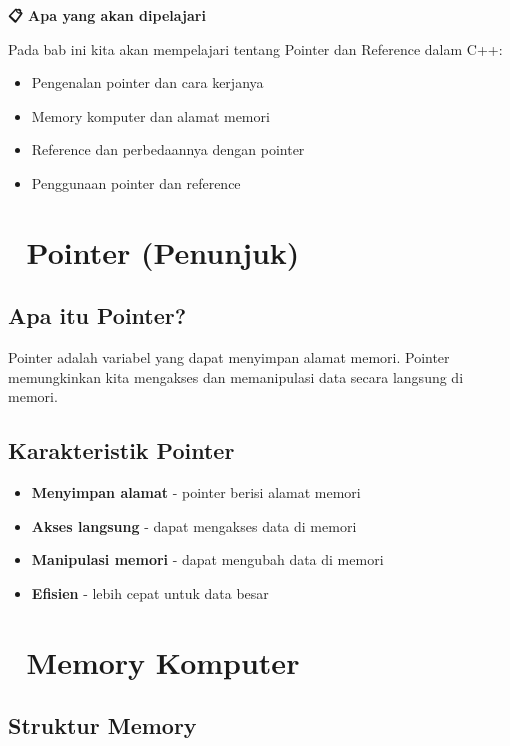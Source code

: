 \textbf{📋 Apa yang akan dipelajari}

Pada bab ini kita akan mempelajari tentang Pointer dan Reference dalam C++:

\begin{itemize}
\item Pengenalan pointer dan cara kerjanya
\item Memory komputer dan alamat memori
\item Reference dan perbedaannya dengan pointer
\item Penggunaan pointer dan reference
\end{itemize}

\minitoc

\section{📍 Pointer (Penunjuk)}\label{apa-itu-pointer}

\subsection{Apa itu Pointer?}

Pointer adalah variabel yang dapat menyimpan alamat memori. Pointer memungkinkan kita mengakses dan memanipulasi data secara langsung di memori.

\subsection{Karakteristik Pointer}

\begin{itemize}
\item \textbf{Menyimpan alamat} - pointer berisi alamat memori
\item \textbf{Akses langsung} - dapat mengakses data di memori
\item \textbf{Manipulasi memori} - dapat mengubah data di memori
\item \textbf{Efisien} - lebih cepat untuk data besar
\end{itemize}

\section{💾 Memory Komputer}\label{memory-komputer}

\subsection{Struktur Memory}


